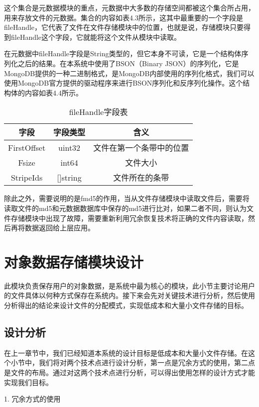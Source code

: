 这个集合是元数据模块的重点，元数据中大多数的存储空间都被这个集合所占用，用来存放文件的元数据。集合的内容如表4.3所示，这其中最重要的一个字段是fileHandle，它代表了文件在文件存储模块中的位置，也就是说，存储模块只要得到fileHandle这个字段，它就能将这个文件从模块中读取。

在元数据中fileHandle字段是String类型的，但它本身不可读，它是一个结构体序列化之后的结果。在本系统中使用了BSON（Binary JSON）的序列化，它是MongoDB提供的一种二进制格式，是MongoDB内部使用的序列化格式，我们可以使用MongoDB官方提供的驱动程序来进行BSON序列化和反序列化操作。这个结构体的内容如表4.4所示。

\begin{table}[h]
  \centering
  \caption{fileHandle字段表}
  \begin{tabular}{ccc}
    \toprule
    字段   & 字段类型   & 含义                          \\
    \midrule
    FirstOffset & uint32     & 文件在第一个条带中的位置                 \\
    Fsize       & int64      & 文件大小                \\
    StripeIds   & []string   & 文件所在的条带         \\
    \bottomrule
  \end{tabular}
\end{table}

除此之外，需要说明的是fmd5的作用，当从文件存储模块中读取文件后，需要将读取文件的md5和元数据数据库中保存的md5进行比对，如果二者不同，则认为文件存储模块中出现了故障，需要重新利用冗余恢复技术将正确的文件内容读取，然后再将数据返回给上层应用。

\section{对象数据存储模块设计}
此模块负责保存用户的对象数据，是系统中最为核心的模块，此小节主要讨论用户的文件具体以何种方式保存在系统内。接下来会先对关键技术进行分析，然后使用分析得出的结论来设计文件的分配模式，实现低成本和大量小文件存储的目标。

\subsection{设计分析}
在上一章节中，我们已经知道本系统的设计目标是低成本和大量小文件存储。在这个小节中，我们将对两个技术点进行设计分析，第一点是冗余方式的使用，第二点是文件的布局。通过对这两个技术点进行分析，可以得出使用怎样的设计方式才能实现我们目标。

1. 冗余方式的使用

